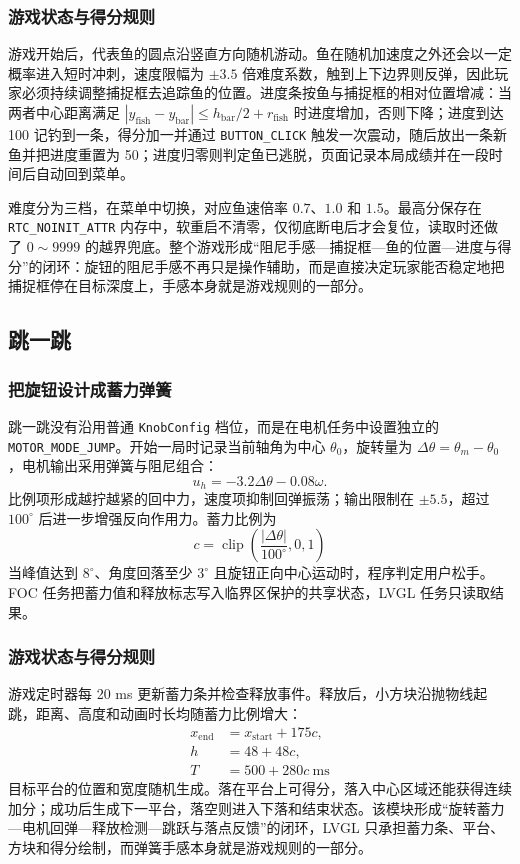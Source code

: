\subsubsection{游戏状态与得分规则}

游戏开始后，代表鱼的圆点沿竖直方向随机游动。鱼在随机加速度之外还会以一定概率进入短时冲刺，速度限幅为 $\pm 3.5$ 倍难度系数，触到上下边界则反弹，因此玩家必须持续调整捕捉框去追踪鱼的位置。进度条按鱼与捕捉框的相对位置增减：当两者中心距离满足 $|y_{\text{fish}}-y_{\text{bar}}|\le h_{\text{bar}}/2+r_{\text{fish}}$ 时进度增加，否则下降；进度到达 100 记钓到一条，得分加一并通过 \texttt{BUTTON\_CLICK} 触发一次震动，随后放出一条新鱼并把进度重置为 50；进度归零则判定鱼已逃脱，页面记录本局成绩并在一段时间后自动回到菜单。

难度分为三档，在菜单中切换，对应鱼速倍率 $0.7$、$1.0$ 和 $1.5$。最高分保存在 \texttt{RTC\_NOINIT\_ATTR} 内存中，软重启不清零，仅彻底断电后才会复位，读取时还做了 $0\sim9999$ 的越界兜底。整个游戏形成“阻尼手感—捕捉框—鱼的位置—进度与得分”的闭环：旋钮的阻尼手感不再只是操作辅助，而是直接决定玩家能否稳定地把捕捉框停在目标深度上，手感本身就是游戏规则的一部分。

\subsection{跳一跳}

\subsubsection{把旋钮设计成蓄力弹簧}

跳一跳没有沿用普通 \texttt{KnobConfig} 档位，而是在电机任务中设置独立的 \texttt{MOTOR\_MODE\_JUMP}。开始一局时记录当前轴角为中心 $\theta_0$，旋转量为 $\Delta\theta=\theta_m-\theta_0$，电机输出采用弹簧与阻尼组合：
\begin{equation}
u_h=-3.2\Delta\theta-0.08\omega.
\end{equation}
比例项形成越拧越紧的回中力，速度项抑制回弹振荡；输出限制在 $\pm5.5$，超过 $100^\circ$ 后进一步增强反向作用力。蓄力比例为
\begin{equation}
c=\operatorname{clip}\left(\frac{|\Delta\theta|}{100^\circ},0,1\right)
\end{equation}
当峰值达到 $8^\circ$、角度回落至少 $3^\circ$ 且旋钮正向中心运动时，程序判定用户松手。FOC 任务把蓄力值和释放标志写入临界区保护的共享状态，LVGL 任务只读取结果。

\subsubsection{游戏状态与得分规则}

游戏定时器每 20 ms 更新蓄力条并检查释放事件。释放后，小方块沿抛物线起跳，距离、高度和动画时长均随蓄力比例增大：
\begin{align}
x_{\mathrm{end}}&=x_{\mathrm{start}}+175c,\\
h&=48+48c,\\
T&=500+280c\ \text{ms}
\end{align}
目标平台的位置和宽度随机生成。落在平台上可得分，落入中心区域还能获得连续加分；成功后生成下一平台，落空则进入下落和结束状态。该模块形成“旋转蓄力—电机回弹—释放检测—跳跃与落点反馈”的闭环，LVGL 只承担蓄力条、平台、方块和得分绘制，而弹簧手感本身就是游戏规则的一部分。
